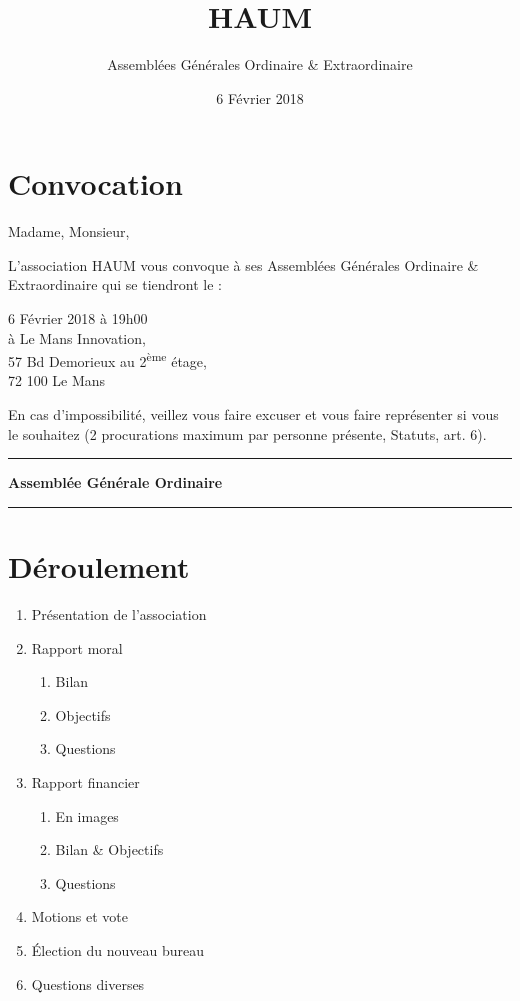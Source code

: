 \documentclass[11pt]{article}
\title{HAUM}
\author{Assemblées Générales Ordinaire \& Extraordinaire}
\date{6 Février 2018}
\begin{document}
\maketitle

\section*{Convocation}

Madame, Monsieur,

L'association HAUM vous convoque à ses Assemblées Générales Ordinaire \& Extraordinaire qui se tiendront le :

\begin{center}
{\Large 6 Février 2018 à 19h00}\\
à Le Mans Innovation, \\57 Bd Demorieux au 2\textsuperscript{ème} étage, \\72 100 Le Mans
\end{center}

En cas d'impossibilité, veillez vous faire excuser et vous faire représenter si vous le souhaitez (2 procurations maximum par personne présente, Statuts, art. 6).

\newpage

\hrule
\vspace{.6cm}
\begin{center}
\Large\bfseries Assemblée Générale Ordinaire
\end{center}
\vspace{.3cm}
\hrule

\vspace{1.5cm}

\section*{Déroulement}

\begin{enumerate}
    \item Présentation de l'association
    \item Rapport moral
        \begin{enumerate}
            \item Bilan
            \item Objectifs
            \item Questions
        \end{enumerate}
    \item Rapport financier
        \begin{enumerate}
						\item En images
            \item Bilan \& Objectifs
            \item Questions
        \end{enumerate}
    \item Motions et vote
    \item Élection du nouveau bureau
    \item Questions diverses
\end{enumerate}
\end{document}
